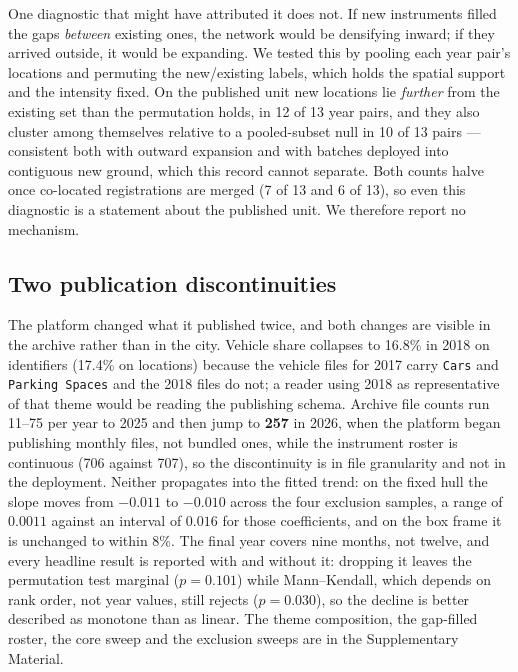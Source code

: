 \documentclass{article}
\newcommand{\hullNoLastPermP}{0.101}
\newcommand{\hullNoLastMkP}{0.030}
\newcommand{\rlAbove}{12}
\newcommand{\rlPairs}{13}
\newcommand{\batchPairs}{10}
\newcommand{\batchTotal}{13}
\begin{document}
One diagnostic that might have attributed it does not. If new instruments filled the gaps
\emph{between} existing ones, the network would be densifying inward; if they arrived outside,
it would be expanding. We tested this by pooling each year pair's locations and permuting the
new/existing labels, which holds the spatial support and the intensity fixed. On the published
unit new locations lie \emph{further} from the existing set than the permutation holds, in
\rlAbove{} of \rlPairs{} year pairs, and they also cluster among themselves relative to a
pooled-subset null in \batchPairs{} of \batchTotal{} pairs --- consistent both with outward
expansion and with batches deployed into contiguous new ground, which this record cannot
separate. Both counts halve once co-located registrations are merged (\num{7} of \num{13} and
\num{6} of \num{13}), so even this diagnostic is a statement about the published unit. We
therefore report no mechanism.

\subsection{Two publication discontinuities}
\label{sec:results-theme}

The platform changed what it published twice, and both changes are visible in the archive rather
than in the city. Vehicle share collapses to 16.8\% in 2018 on identifiers (17.4\% on locations)
because the vehicle files for 2017 carry \texttt{Cars} and \texttt{Parking~Spaces} and the 2018
files do not; a reader using 2018 as representative of that theme would be reading the
publishing schema. Archive file counts run 11--75 per year to 2025 and then jump to \textbf{257}
in 2026, when the platform began publishing monthly files, not bundled ones, while the
instrument roster is continuous (706 against 707), so the discontinuity is in file granularity
and not in the deployment. Neither propagates into the fitted trend: on the fixed hull the slope
moves from $-0.011$ to $-0.010$ across the four exclusion samples, a range of $0.0011$ against an
interval of $0.016$ for those coefficients, and on the box frame it is unchanged to within 8\%.
The final year covers nine months, not twelve, and every headline result is reported with
and without it: dropping it leaves the permutation test marginal ($p = \hullNoLastPermP$) while
Mann--Kendall, which depends on rank order, not year values, still rejects
($p = \hullNoLastMkP$), so the decline is better described as monotone than as linear. The theme
composition, the gap-filled roster, the core sweep and the exclusion sweeps are in the
Supplementary Material.
\end{document}
